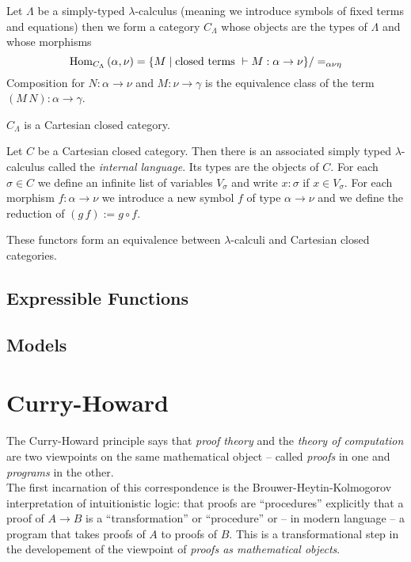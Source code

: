 \documentclass[12pt]{article}
\begin{document}
\begin{defn}
Let $\Lambda$ be a simply-typed $\lambda$-calculus (meaning we introduce symbols of fixed terms and equations) then we form a category $C_\Lambda$ whose objects are the types of $\Lambda$ and whose morphisms 
\[ \mathrm{Hom}_{C_\Lambda} \left( \alpha, \nu \right) = \{ M \mid \text{closed terms } \vdash M : \alpha \to \nu \} / =_{\alpha \nu \eta} \]
Composition for $N : \alpha \to \nu$ and $M : \nu \to \gamma$ is the equivalence class of the term $(M \, N) : \alpha \to \gamma$. 
\end{defn}

\begin{prop}
$C_\Lambda$ is a Cartesian closed category. 
\end{prop}

\begin{defn}
Let $C$ be a Cartesian closed category. Then there is an associated simply typed $\lambda$-calculus called the \textit{internal language}. Its types are the objects of $C$. For each $\sigma \in C$ we define an infinite list of variables $V_\sigma$ and write $x : \sigma$ if $x \in V_\sigma$. For each morphism $f : \alpha \to \nu$ we introduce a new symbol $f$ of type $\alpha \to \nu$ and we define the reduction of $(g \, f) := g \circ f$.
\end{defn}

\begin{theorem}
These functors form an equivalence between $\lambda$-calculi and Cartesian closed categories. 
\end{theorem}

\subsection{Expressible Functions}

\subsection{Models}

\section{Curry-Howard}

The Curry-Howard principle says that \textit{proof theory} and the \textit{theory of computation} are two viewpoints on the same mathematical object -- called \textit{proofs} in one and \textit{programs} in the other.
\bigskip\\
The first incarnation of this correspondence is the Brouwer-Heytin-Kolmogorov interpretation of intuitionistic logic: that proofs are ``procedures'' explicitly that a proof of $A \to B$ is a ``transformation'' or ``procedure'' or -- in modern language -- a program that takes proofs of $A$ to proofs of $B$. This is a transformational step in the developement of the viewpoint of \textit{proofs as mathematical objects}. 
\end{document}
